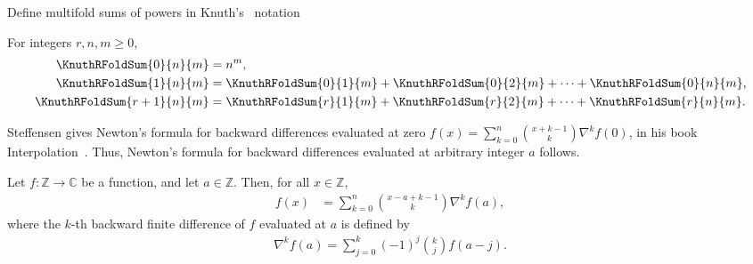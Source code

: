 Define multifold sums of powers in Knuth's~\cite{knuth1993johann} notation
\begin{proposition} 
  \label{prop:multifold-sums-of-powers-recurrence}
  For integers $r,n,m \geq 0$,
  \begin{align*}
    \KnuthRFoldSum{0}{n}{m}   &= n^m, \\
    \KnuthRFoldSum{1}{n}{m}   &= \KnuthRFoldSum{0}{1}{m}
    + \KnuthRFoldSum{0}{2}{m} + \cdots + \KnuthRFoldSum{0}{n}{m}, \\
    \KnuthRFoldSum{r+1}{n}{m} &= \KnuthRFoldSum{r}{1}{m}
    + \KnuthRFoldSum{r}{2}{m} + \cdots + \KnuthRFoldSum{r}{n}{m}.
  \end{align*}
\end{proposition}
Steffensen
gives Newton's formula for backward differences evaluated
at zero $f(x) = \sum_{k=0}^{n} \binom{x+k-1}{k} \nabla^{k} f(0)$,
in his book
Interpolation~\cite[chapter 2, eq. (19)]{steffensen1927interpolation}.
Thus, Newton's formula for backward differences evaluated
at arbitrary integer $a$ follows.
\begin{proposition}
  Let $f\colon \mathbb{Z} \to \mathbb{C}$ be a function,
  and let $a \in \mathbb{Z}$.
  Then, for all $x \in \mathbb{Z}$,
  \label{prop:newtons-formula-via-backward-difference}
  \begin{align*}
    f(x) &= \sum_{k=0}^{n} \binom{x-a+k-1}{k} \nabla^{k} f(a),
  \end{align*}
  where the $k$-th backward finite difference of $f$ evaluated
  at $a$ is defined by
  \begin{align*}
    \nabla^{k} f(a) = \sum_{j=0}^{k} (-1)^{j} \binom{k}{j} f(a-j).
  \end{align*}
\end{proposition}
